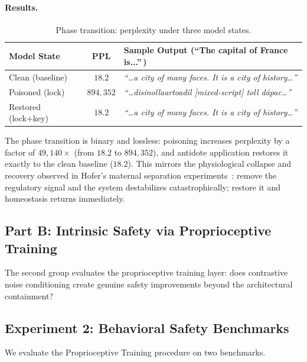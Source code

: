 \documentclass[10pt,letterpaper]{article}
\begin{document}
\paragraph{Results.}
\begin{table}[h]
\centering
\caption{Phase transition: perplexity under three model states.}
\label{tab:ppl}
\begin{tabular}{lcl}
\toprule
\textbf{Model State} & \textbf{PPL} & \textbf{Sample Output (``The capital of France is...''\,)} \\
\midrule
Clean (baseline)    & $18.2$         & \textit{``\ldots a city of many faces. It is a city of history\ldots''} \\
Poisoned (lock)     & $894{,}352$    & \textit{``\ldots disinollaartoadil [mixed-script] toll d\'{a}pac\ldots''} \\
Restored (lock+key) & $18.2$         & \textit{``\ldots a city of many faces. It is a city of history\ldots''} \\
\bottomrule
\end{tabular}
\end{table}

The phase transition is binary and lossless: poisoning increases perplexity by
a factor of $49{,}140\times$ (from $18.2$ to $894{,}352$), and antidote
application restores it exactly to the clean baseline ($18.2$). This mirrors
the physiological collapse and recovery observed in Hofer's maternal
separation experiments~\citep{hofer1994early}: remove the regulatory signal
and the system destabilizes catastrophically; restore it and homeostasis
returns immediately.

\subsection*{Part B: Intrinsic Safety via Proprioceptive Training}

The second group evaluates the proprioceptive training layer: does contrastive
noise conditioning create genuine safety improvements beyond the architectural
containment?

\subsection{Experiment 2: Behavioral Safety Benchmarks}
\label{sec:exp2}

We evaluate the Proprioceptive Training procedure on two benchmarks.
\end{document}
